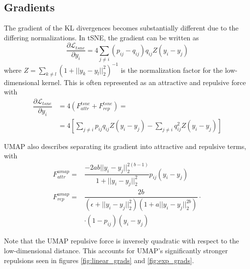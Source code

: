 \documentclass{article}
\theoremstyle{definition}
\begin{document}
\subsection{Gradients}

The gradient of the KL divergences becomes substantially different due to the differing normalizations. In tSNE, the gradient can be written as
\begin{equation}
    \dfrac{\partial \mathcal{L}_{tsne}}{\partial y_i} = 4 \sum_{j \neq i} (p_{ij} - q_{ij}) q_{ij} Z (y_i - y_j)
\end{equation}
where $Z = \sum_{k \neq l} (1 + ||y_k - y_l||_2^2)^{-1}$ is the normalization factor for the low-dimensional kernel. This is often represented as an attractive
and repulsive force with
\begin{align*}
    \dfrac{\partial \mathcal{L}_{tsne}}{\partial y_i} &= 4(F^{tsne}_{attr} + F^{tsne}_{rep}) = \\
    &= 4 \left[ \sum_{j \neq i} p_{ij}q_{ij}Z (y_i - y_j) - \sum_{j \neq i} q_{ij}^2
Z (y_i - y_j) \right]
\end{align*}

UMAP also describes separating its gradient into attractive and repulsive terms, with
\begin{align}
    F_{attr}^{umap} = &\dfrac{-2ab||y_i - y_j||_2^{2(b-1)}}{1 + ||y_i - y_j||_2^2} p_{ij} (y_i - y_j) \\
    F_{rep}^{umap} = &\dfrac{2b}{(\epsilon + ||y_i - y_j||_2^2)(1 + a ||y_i - y_j||_2^{2b})} \cdot \\
    &\cdot (1 - p_{ij}) (y_i - y_j) \label{umap_rep}
\end{align}

Note that the UMAP repulsive force is inversely quadratic with respect to the low-dimensional distance. This accounts for UMAP's significantly stronger
repulsions seen in figures \ref{fig:linear_grads} and \ref{fig:exp_grads}.
\end{document}
